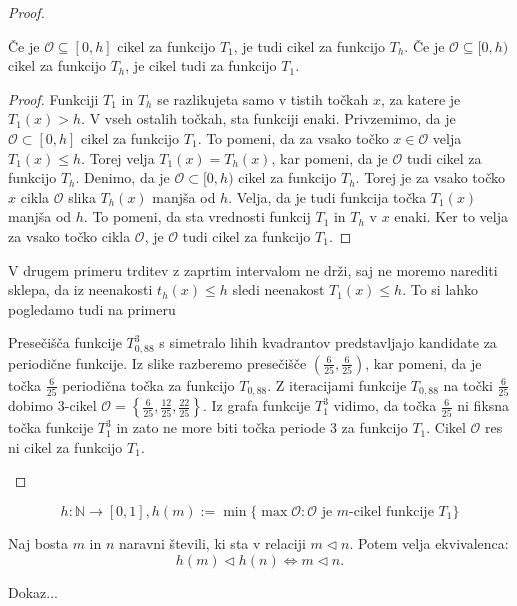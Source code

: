 \documentclass[mat2]{fmfdelo}
\newcommand{\N}{\mathbb N}
\begin{document}
\begin{proof}
\begin{lema}
Če je $\mathcal{O} \subseteq [0, h]$ cikel za funkcijo $T_1$, je tudi cikel za funkcijo $T_h$.
Če je $\mathcal{O} \subseteq [0, h)$ cikel za funkcijo $T_h$, je cikel tudi za funkcijo $T_1$.
\end{lema}
\begin{proof}
Funkciji $T_1$ in $T_h$ se razlikujeta samo v tistih točkah $x$, za katere je $T_1(x) > h$. V vseh ostalih točkah, sta funkciji enaki. Privzemimo, da je $\mathcal{O} \subset [0, h]$ cikel za funkcijo $T_1$. To pomeni, da za vsako točko $x \in \mathcal{O}$ velja $T_1(x) \leq h$. Torej velja $T_1(x)=T_h(x)$, kar pomeni, da je $\mathcal{O}$ tudi cikel za funkcijo $T_h$. 
Denimo, da je $\mathcal{O} \subset [0, h)$ cikel za funkcijo $T_h$. Torej je za vsako točko $x$ cikla $\mathcal{O}$ slika $T_h(x)$ manjša od $h$. Velja, da je tudi funkcija točka $T_1(x)$ manjša od $h$. To pomeni, da sta vrednosti funkcij $T_1$ in $T_h$ v $x$ enaki. Ker to velja za vsako točko cikla $\mathcal{O}$, je $\mathcal{O}$ tudi cikel za funkcijo $T_1$.
\end{proof}
V drugem primeru trditev z zaprtim intervalom ne drži, saj ne moremo narediti sklepa, da iz neenakosti $t_h(x) \leq h$ sledi neenakost $T_1(x) \leq h$. To si lahko pogledamo tudi na primeru
\begin{primer}
Presečišča funkcije $T_{0,88}^3$ s simetralo lihih kvadrantov predstavljajo kandidate za periodične funkcije. Iz slike razberemo presečišče $(\frac{6}{25}, \frac{6}{25})$, kar pomeni, da je točka $\frac{6}{25}$ periodična točka za funkcijo $T_{0,88}$. Z iteracijami funkcije $T_{0,88}$ na točki $\frac{6}{25}$ dobimo 3-cikel $\mathcal{O} = \left\{ \frac{6}{25}, \frac{12}{25}, \frac{22}{25} \right\}$. Iz grafa funkcije $T_1^3$ vidimo, da točka $\frac{6}{25}$ ni fiksna točka funkcije $T_1^3$ in zato ne more biti točka periode 3 za funkcijo $T_1$. Cikel $\mathcal{O}$ res ni cikel za funkcijo $T_1$.
\end{primer}

\end{proof}

$$h: \N \to [0, 1], h(m) := \min\{\max \mathcal{O}: \mathcal{O}\text{ je }m\text{-cikel funkcije }T_1 \}$$

\begin{lema}
Naj bosta $m$ in $n$ naravni števili, ki sta v relaciji $m \triangleleft n$. Potem velja ekvivalenca:
$$h(m) \triangleleft h(n) \iff m \triangleleft n.$$
\end{lema}
\begin{dokaz}
Dokaz...
\end{dokaz}
\end{document}
